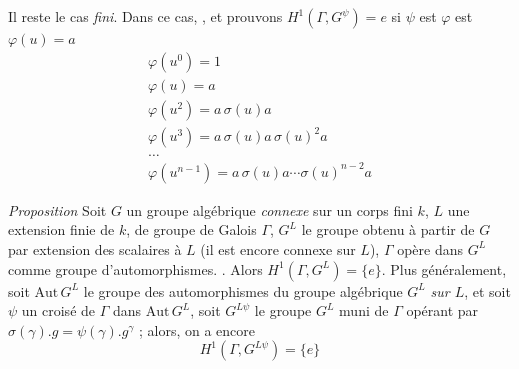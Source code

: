 \documentclass[11pt,a4paper]{article}
\begin{document}
Il reste  le cas  \emph{fini}. Dans ce cas,
 \ill{} \ill{}, et prouvons
$H^1(\Gamma, G^{\psi}) = e$ si $\psi$ est \ill{} $\varphi$ est 
\ill{} \ill{} $\varphi(u) = a$
\begin{gather*}
  \varphi(u^0) = 1 \\
  \varphi(u) = a \\
  \varphi(u^2) = a\,\sigma(u)a \\
  \varphi(u^3) = a\,\sigma(u)a\,\sigma(u)^2 a \\
  \ldots \\
  \varphi(u^{n-1}) = a\,\sigma(u)a \cdots \sigma(u)^{n-2}a
\end{gather*}


\emph{Proposition} \quad Soit $G$ un groupe algébrique \emph{connexe} sur un
corps fini $k$, $L$ une extension finie de $k$, de groupe de Galois $\Gamma$,
$G^{L}$ le groupe obtenu à partir de $G$ par extension des scalaires à $L$ (il
est encore connexe sur $L$), $\Gamma$ opère dans $G^{L}$ comme groupe
d'automorphismes. . Alors $H^1(\Gamma, G^{L}) = \lbrace
e \rbrace$. Plus généralement, soit $\mathrm{Aut}\,G^{L}$ le groupe des
automorphismes du groupe algébrique $G^{L}$ \emph{sur $L$}, et soit $\psi$ un
\struck{\ill{}}  croisé de $\Gamma$ dans $\mathrm{Aut}\,G^{L}$, soit
$G^{L\psi}$ le groupe $G^{L}$ muni de $\Gamma$ opérant par
$\sigma(\gamma).g = \psi(\gamma).g^{\gamma}$ ; alors, on a encore
\[
  H^1(\Gamma, G^{L\psi}) = \lbrace e \rbrace
\]
\end{document}
